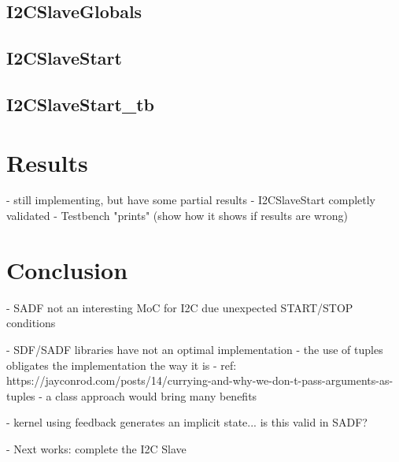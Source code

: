 \subsection{I2CSlaveGlobals}
\subsection{I2CSlaveStart}
\subsection{I2CSlaveStart_tb}

\section{Results}
- still implementing, but have some partial results
- I2CSlaveStart completly validated
- Testbench "prints" (show how it shows if results are wrong)

\section{Conclusion}
- SADF not an interesting MoC for I2C due unexpected START/STOP conditions

- SDF/SADF libraries have not an optimal implementation
- the use of tuples obligates the implementation the way it is
- ref: https://jayconrod.com/posts/14/currying-and-why-we-don-t-pass-arguments-as-tuples
- a class approach would bring many benefits

- kernel using feedback generates an implicit state... is this valid in SADF?

- Next works: complete the I2C Slave




